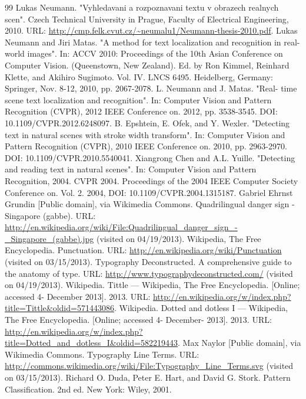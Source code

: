 \documentclass[12pt,a4paper]{report}
\begin{document}
\begin{thebibliography}{99}
 Lukas Neumann. "Vyhledavani a rozpoznavani textu v obrazech realnych scen". Czech Technical University in Prague, Faculty of Electrical Engineering, 2010. URL: \url{http://cmp.felk.cvut.cz/~neumalu1/Neumann-thesis-2010.pdf}.
 Lukas Neumann and Jiri Matas. "A method for text localization and recognition in real- world images". In: ACCV 2010: Proceedings of the 10th Asian Conference on Computer Vision. (Queenstown, New Zealand). Ed. by Ron Kimmel, Reinhard Klette, and Akihiro Sugimoto. Vol. IV. LNCS 6495. Heidelberg, Germany: Springer, Nov. 8-12, 2010, pp. 2067-2078.
 L. Neumann and J. Matas. "Real- time scene text localization and recognition". In: Computer Vision and Pattern Recognition (CVPR), 2012 IEEE Conference on. 2012, pp. 3538-3545. DOI: 10.1109/CVPR.2012.6248097.
 B. Epshtein, E. Ofek, and Y. Wexler. "Detecting text in natural scenes with stroke width transform". In: Computer Vision and Pattern Recognition (CVPR), 2010 IEEE Conference on. 2010, pp. 2963-2970. DOI: 10.1109/CVPR.2010.5540041.
 Xiangrong Chen and A.L. Yuille. "Detecting and reading text in natural scenes". In: Computer Vision and Pattern Recognition, 2004. CVPR 2004. Proceedings of the 2004 IEEE Computer Society Conference on. Vol. 2. 2004, DOI: 10.1109/CVPR.2004.1315187.
 Gabriel Ehrnst Grundin [Public domain], via Wikimedia Commons. Quadrilingual danger sign - Singapore (gabbe). URL: \url{http://en.wikipedia.org/wiki/File:Quadrilingual_danger_sign_-_Singapore_(gabbe).jpg} (visited on 04/19/2013).
 Wikipedia, The Free Encyclopedia. Punctuation. URL: \url{http://en.wikipedia.org/wiki/Punctuation} (visited on 03/15/2013).
 Typography Deconstructed. A comprehensive guide to the anatomy of type. URL: \url{http://www.typographydeconstructed.com/} (visited on 04/19/2013).
 Wikipedia. Tittle — Wikipedia, The Free Encyclopedia. [Online; accessed 4- December 2013]. 2013. URL: \url{http://en.wikipedia.org/w/index.php?title=Tittle&oldid=571443086}.
 Wikipedia. Dotted and dotless I — Wikipedia, The Free Encyclopedia. [Online; accessed 4- December- 2013]. 2013. URL: \url{http://en.wikipedia.org/w/index.php?title=Dotted_and_dotless_I&oldid=582219443}.
 Max Naylor [Public domain], via Wikimedia Commons. Typography Line Terms. URL: \url{http://commons.wikimedia.org/wiki/File:Typography_Line_Terms.svg} (visited on 03/15/2013).
 Richard O. Duda, Peter E. Hart, and David G. Stork. Pattern Classification. 2nd ed. New York: Wiley, 2001.

\end{thebibliography}
\end{document}
